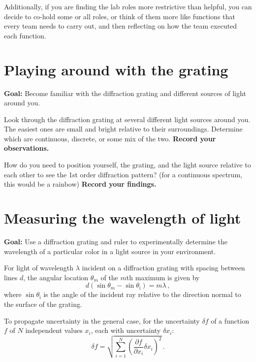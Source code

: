 Additionally, if you are finding the lab roles more restrictive than helpful, you can decide to co-hold some or all roles, or think of them more like functions that every team needs to carry out, and then reflecting on how the team executed each function.

\section{Playing around with the grating}

\textbf{Goal:} Become familiar with the diffraction grating and different sources of light around you.

\begin{steps}
	
	\item Look through the diffraction grating at several different light sources around you. The easiest ones are small and bright relative to their surroundings. Determine which are continuous, discrete, or some mix of the two. \textbf{Record your observations.}
	
	\item How do you need to position yourself, the grating, and the light source relative to each other to see the 1st order diffraction pattern? (for a continuous spectrum, this would be a rainbow) \textbf{Record your findings.}
	
\end{steps}

\section{Measuring the wavelength of light}

\textbf{Goal:} Use a diffraction grating and ruler to experimentally determine the wavelength of a particular color in a light source in your environment.

For light of wavelength $\lambda$ incident on a diffraction grating with spacing between lines $d$, the angular location $\theta_m$ of the $m$th maximum is given by
\begin{equation}\label{spechome:eq:grating}
 d \left(\sin \theta_m - \sin \theta_\textrm{i} \right) = m \lambda \,,
\end{equation}
where $\sin \theta_\textrm{i}$ is the angle of the incident ray relative to the direction normal to the surface of the grating.

To propagate uncertainty in the general case, for the uncertainty $\delta f$ of a function $f$ of $N$ independent values $x_i$, each with uncertainty $\delta x_i$:
\begin{equation}\label{unc:general}
\delta f = \sqrt{ \sum_{i=1}^{N} \left(\frac{\partial f}{\partial x_i} \delta x_i\right)^2 } \, .
\end{equation}

